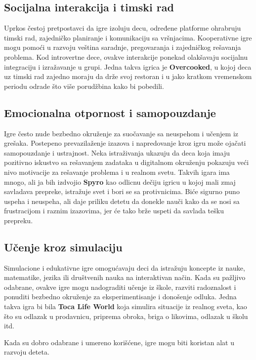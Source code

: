 \documentclass[a4paper,12pt]{article}
\begin{document}
\subsection*{Socijalna interakcija i timski rad}
Uprkos čestoj pretpostavci da igre izoluju decu, određene platforme ohrabruju timski rad, zajedničko planiranje i komunikaciju sa vršnjacima. 
Kooperativne igre mogu pomoći u razvoju veština saradnje, pregovaranja i zajedničkog rešavanja problema. Kod introvertne dece, ovakve interakcije ponekad olakšavaju socijalnu integraciju i izražavanje u grupi. Jedna takva igrica je \textbf{Overcooked}, u kojoj deca uz timski rad zajedno moraju da drže svoj restoran i u jako kratkom vremenskom periodu odrade što više porudžbina kako bi pobedili.

\subsection*{Emocionalna otpornost i samopouzdanje}
Igre često nude bezbedno okruženje za suočavanje sa neuspehom i učenjem iz grešaka. 
Postepeno prevazilaženje izazova i napredovanje kroz igru može ojačati samopouzdanje i ustrajnost. 
Neka istraživanja ukazuju da deca koja imaju pozitivno iskustvo sa rešavanjem zadataka u digitalnom okruženju pokazuju veći nivo motivacije za rešavanje problema i u realnom svetu. Takvih igara ima mnogo, ali ja bih izdvojio \textbf{Spyro} kao odlicnu dečiju igricu u kojoj mali zmaj savladava prepreke, istražuje svet i bori se sa protivnicima. Biće sigurno puno uspeha i neuspeha, ali daje priliku detetu da donekle nauči kako da se nosi sa frustracijom i raznim izazovima, jer će tako brže uspeti da savlada tešku prepreku.

\subsection*{Učenje kroz simulaciju}
Simulacione i edukativne igre omogućavaju deci da istražuju koncepte iz nauke, matematike, jezika ili društvenih nauka na interaktivan način. 
Kada su pažljivo odabrane, ovakve igre mogu nadograditi učenje iz škole, razviti radoznalost i ponuditi bezbedno okruženje za eksperimentisanje i donošenje odluka. Jedna takva igra bi bila \textbf{Toca Life World} koja simulira situacije iz realnog sveta, kao što su odlazak u prodavnicu, priprema obroka, briga o likovima, odlazak u školu itd.

\bigskip

Kada su dobro odabrane i umereno korišćene, igre mogu biti koristan alat u razvoju deteta.
\end{document}
